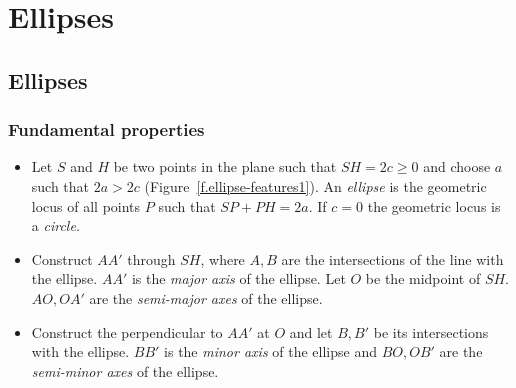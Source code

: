 
\part{Ellipses}


\chapter{Ellipses}\label{s.ellipse}

\section{Fundamental properties}

\begin{definition}[Ellipse]\label{def.ellipse1}
\mbox{}
\begin{itemize}
\item Let $S$ and $H$ be two points in the plane such that $SH=2c\geq 0$ and choose $a$ such that $2a> 2c$ (Figure~\ref{f.ellipse-features1}). An \emph{ellipse} is the geometric locus of all points $P$ such that $SP+PH=2a$. If $c=0$ the geometric locus is a \emph{circle}.
\item Construct $AA'$ through $SH$, where $A,B$ are the intersections of the line with the ellipse. $AA'$ is  the \emph{major axis} of the ellipse. Let $O$ be the midpoint of $SH$. $AO,OA'$ are the \emph{semi-major axes} of the ellipse.
\item Construct the perpendicular to $AA'$ at $O$ and let $B,B'$ be its intersections with the ellipse. $BB'$ is the \emph{minor axis} of the ellipse and $BO,OB'$ are the \emph{semi-minor axes} of the ellipse.
\end{itemize}
\end{definition}


